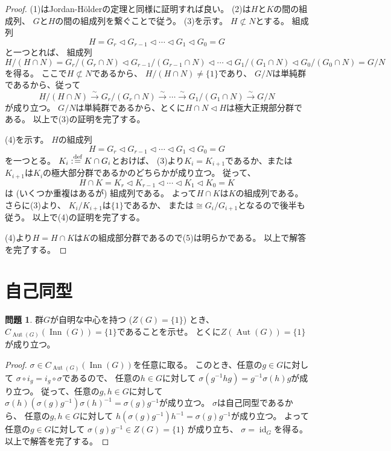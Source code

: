 \documentclass[uplatex]{jsreport}
\theoremstyle{definition}
\newtheorem{prob}[prob]{問題}
\DeclareMathOperator{\id}{\mathrm{id}}
\DeclareMathOperator{\INN}{\mathrm{Inn}}
\DeclareMathOperator{\Aut}{\mathrm{Aut}}
\newcommand{\dfn}{:\overset{\mbox{{\scriptsize def}}}{=}}
\begin{document}
\begin{proof}
  (1)はJordan-H\"{o}lderの定理と同様に証明すれば良い。
  (2)は\(H\)と\(K\)の間の組成列、
  \(G\)と\(H\)の間の組成列を繋ぐことで従う。
  (3)を示す。
  \(H\not\subset N\)とする。
  組成列
  \[H = G_r \lhd G_{r-1} \lhd \cdots \lhd G_1 \lhd G_0 = G\]
  と一つとれば、
  組成列
  \[
  H/(H\cap N) = G_r/(G_r\cap N) \lhd G_{r-1}/(G_{r-1}\cap N)
  \lhd \cdots \lhd G_1/(G_1\cap N) \lhd G_0/(G_0\cap N) = G/N
  \]
  を得る。
  ここで\(H\not\subset N\)であるから、
  \(H/(H\cap N) \neq \{1\}\)であり、
  \(G/N\)は単純群であるから、従って
  \[
  H/(H\cap N) \xrightarrow{\sim} G_r/(G_r\cap N) \xrightarrow{\sim}
  \cdots \xrightarrow{\sim} G_1/(G_1\cap N) \xrightarrow{\sim} G/N
  \]
  が成り立つ。
  \(G/N\)は単純群であるから、とくに\(H\cap N \lhd H\)は極大正規部分群である。
  以上で(3)の証明を完了する。

  (4)を示す。
  \(H\)の組成列
  \[H = G_r \lhd G_{r-1} \lhd \cdots \lhd G_1 \lhd G_0 = G\]
  を一つとる。
  \(K_i\dfn K\cap G_i\)とおけば、
  (3)より\(K_i = K_{i+1}\)であるか、または
  \(K_{i+1}\)は\(K_i\)の極大部分群であるかのどちらかが成り立つ。
  従って、
  \[H\cap K = K_r \lhd K_{r-1} \lhd \cdots \lhd K_1 \lhd K_0 = K\]
  は (いくつか重複はあるが) 組成列である。
  よって\(H\cap K\)は\(K\)の組成列である。
  さらに(3)より、
  \(K_i/K_{i+1}\)は\(\{1\}\)であるか、
  または\(\cong G_i/G_{i+1}\)となるので後半も従う。
  以上で(4)の証明を完了する。

  (4)より\(H = H\cap K\)は\(K\)の組成部分群であるので(5)は明らかである。
  以上で解答を完了する。
\end{proof}




\section{自己同型}


\begin{prob}
  群\(G\)が自明な中心を持つ (\(Z(G) = \{1\}\)) とき、
  \(C_{\Aut(G)}(\INN(G)) = \{1\}\)であることを示せ。
  とくに\(Z(\Aut(G)) = \{1\}\)が成り立つ。
\end{prob}

\begin{proof}
  \(\sigma \in C_{\Aut(G)}(\INN(G))\)を任意に取る。
  このとき、任意の\(g\in G\)に対して
  \(\sigma \circ i_g = i_g \circ \sigma\)であるので、
  任意の\(h\in G\)に対して
  \(\sigma(g^{-1}hg) = g^{-1}\sigma(h)g\)が成り立つ。
  従って、任意の\(g,h\in G\)に対して
  \(\sigma(h)(\sigma(g)g^{-1})\sigma(h)^{-1} = \sigma(g)g^{-1}\)が成り立つ。
  \(\sigma\)は自己同型であるから、
  任意の\(g,h\in G\)に対して
  \(h(\sigma(g)g^{-1})h^{-1} = \sigma(g)g^{-1}\)が成り立つ。
  よって任意の\(g\in G\)に対して
  \(\sigma(g)g^{-1}\in Z(G) = \{1\}\)
  が成り立ち、
  \(\sigma = \id_G\)を得る。
  以上で解答を完了する。
\end{proof}
\end{document}
